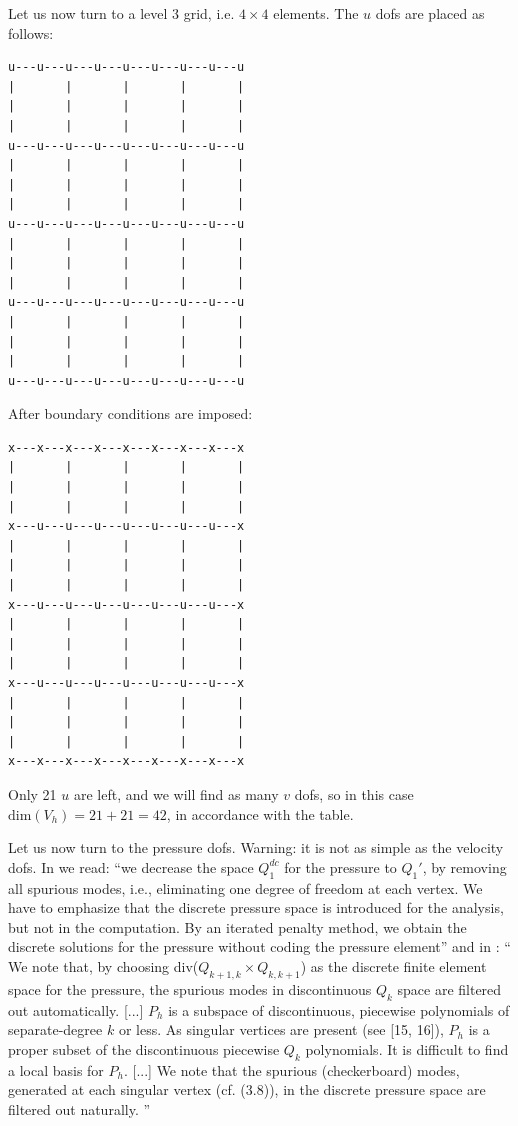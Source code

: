 \newpage
Let us now turn to a level 3 grid, i.e. $4\times 4$ elements. 
The $u$ dofs are placed as follows:
\begin{verbatim}
u---u---u---u---u---u---u---u---u
|       |       |       |       |
|       |       |       |       |
|       |       |       |       |
u---u---u---u---u---u---u---u---u
|       |       |       |       |
|       |       |       |       |
|       |       |       |       |
u---u---u---u---u---u---u---u---u
|       |       |       |       |
|       |       |       |       |
|       |       |       |       |
u---u---u---u---u---u---u---u---u
|       |       |       |       |
|       |       |       |       |
|       |       |       |       |
u---u---u---u---u---u---u---u---u
\end{verbatim}
After boundary conditions are imposed:
\begin{verbatim}
x---x---x---x---x---x---x---x---x
|       |       |       |       |
|       |       |       |       |
|       |       |       |       |
x---u---u---u---u---u---u---u---x
|       |       |       |       |
|       |       |       |       |
|       |       |       |       |
x---u---u---u---u---u---u---u---x
|       |       |       |       |
|       |       |       |       |
|       |       |       |       |
x---u---u---u---u---u---u---u---x
|       |       |       |       |
|       |       |       |       |
|       |       |       |       |
x---x---x---x---x---x---x---x---x
\end{verbatim}
Only 21 $u$ are left, and we will find as many $v$ dofs, so in this case $\text{dim}(V_h)=21+21=42$,
in accordance with the table. 

Let us now turn to the pressure dofs. 
Warning: it is not as simple as the velocity dofs. 
In \textcite{huzh11} we read: ``we decrease the space $Q_1^{dc}$ 
for the pressure to $Q_1'$, by removing all spurious modes, i.e.,
eliminating one degree of freedom at each vertex. We have to emphasize
that the discrete pressure space is introduced for the analysis, but not in the
computation. By an iterated penalty method, we obtain the discrete solutions
for the pressure without coding the pressure element''
and in 
\textcite{zhan09}:
``
We note that, by choosing div($Q_{k+1,k}\times Q_{k,k+1}$) 
as the discrete ﬁnite element space for the pressure, the spurious
modes in discontinuous $Q_k$ space are filtered out automatically.
[...]
$P_h$ is a subspace of discontinuous, piecewise polynomials
of separate-degree $k$ or less. As singular vertices are present (see [15, 16]), 
$P_h$ is a proper subset of the discontinuous piecewise $Q_k$ 
polynomials. It is difficult to ﬁnd a local basis for $P_h$.
[...]
We note that the spurious (checkerboard) modes, generated at each 
singular vertex (cf. (3.8)), in the discrete pressure space are ﬁltered
out naturally.
''

